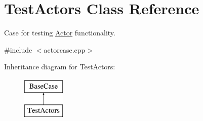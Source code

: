 \hypertarget{classTestActors}{}\section{Test\+Actors Class Reference}
\label{classTestActors}


Case for testing \mbox{\hyperlink{classActor}{Actor}} functionality.  




{\ttfamily \#include $<$actorcase.\+cpp$>$}

Inheritance diagram for Test\+Actors\+:\begin{figure}[H]
\begin{center}
\leavevmode
\includegraphics[height=2.000000cm]{classTestActors}
\end{center}
\end{figure}
